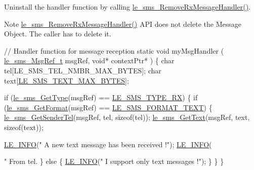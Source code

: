 Uninstall the handler function by calling {\ttfamily \hyperlink{le__sms__interface_8h_a2f474706ba6d7a40083fe1f50f530101}{le\+\_\+sms\+\_\+\+Remove\+Rx\+Message\+Handler()}}. \begin{DoxyNote}{Note}
{\ttfamily \hyperlink{le__sms__interface_8h_a2f474706ba6d7a40083fe1f50f530101}{le\+\_\+sms\+\_\+\+Remove\+Rx\+Message\+Handler()}} A\+P\+I does not delete the Message Object. The caller has to delete it.
\end{DoxyNote}

\begin{DoxyCode}
[...]

\textcolor{comment}{// Handler function for message reception}
\textcolor{keyword}{static} \textcolor{keywordtype}{void} myMsgHandler
(
     \hyperlink{le__sms__interface_8h_a8eb2a15362fe26516fc68fd7a7d5e3e7}{le\_sms\_MsgRef\_t} msgRef,
     \textcolor{keywordtype}{void}*           contextPtr*
)
\{
    \textcolor{keywordtype}{char}   tel[LE\_SMS\_TEL\_NMBR\_MAX\_BYTES];
    \textcolor{keywordtype}{char}   text[\hyperlink{le__sms__interface_8h_a0dc5c2cec7c1fb166c47393fbb07e43f}{LE\_SMS\_TEXT\_MAX\_BYTES}];

    \textcolor{keywordflow}{if} (\hyperlink{le__sms__interface_8h_a2a63c6b5179025a80fb86c7f188e1eb7}{le\_sms\_GetType}(msgRef) == \hyperlink{le__sms__interface_8h_a9001c5bc939bda5d5865e363bdf7662ca29050c2aa56f58a199d292d51be4fa01}{LE\_SMS\_TYPE\_RX})
    \{
        \textcolor{keywordflow}{if} (\hyperlink{le__sms__interface_8h_a5c2b8ce7043b4732c7b0ede7c5d7118c}{le\_sms\_GetFormat}(msgRef) == \hyperlink{le__sms__interface_8h_a337778c44e63660c44fa2116699296c0a1bb6a0d76a622b1185ee879e1595dff8}{LE\_SMS\_FORMAT\_TEXT})
        \{
            \hyperlink{le__sms__interface_8h_a68bfd509a8a3fd4ae39bde7ac5c32d8d}{le\_sms\_GetSenderTel}(msgRef, tel, \textcolor{keyword}{sizeof}(tel));
            \hyperlink{le__sms__interface_8h_ac598dec158aed1e9fa134daf22c704db}{le\_sms\_GetText}(msgRef, text, \textcolor{keyword}{sizeof}(text));

            \hyperlink{le__log_8h_a23e6d206faa64f612045d688cdde5808}{LE\_INFO}(\textcolor{stringliteral}{" A new text message has been received !"});
            \hyperlink{le__log_8h_a23e6d206faa64f612045d688cdde5808}{LE\_INFO}(\textcolor{stringliteral}{" From tel.%
        \}
        \textcolor{keywordflow}{else}
        \{
            \hyperlink{le__log_8h_a23e6d206faa64f612045d688cdde5808}{LE\_INFO}(\textcolor{stringliteral}{" I support only text messages !"});
        \}
    \}
\}


}
\end{DoxyCode}
